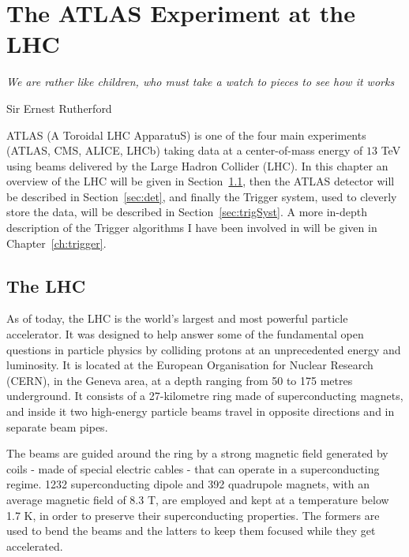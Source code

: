 \chapter{The ATLAS Experiment at the LHC}
\epigraph{\emph{We are rather like children, who must take a watch to pieces to see how it works}}{Sir Ernest Rutherford}

	ATLAS (A Toroidal LHC ApparatuS) is one of the four main experiments (ATLAS, CMS, ALICE, LHCb) taking data at a center-of-mass energy of $13$ TeV using beams delivered by the Large Hadron Collider (LHC). In this chapter an overview of the LHC will be given in Section~\ref{sec:lhc}, then the ATLAS detector will be described in Section~\ref{sec:det}, and finally the Trigger system, used to cleverly store the data, will be described in Section~\ref{sec:trigSyst}. A more in-depth description of the Trigger algorithms I have been involved in will be given in Chapter~\ref{ch:trigger}.



	\section{The LHC}
	\label{sec:lhc}
	
		As of today, the LHC is the world’s largest and most powerful particle accelerator. It was designed to help answer some of the fundamental open questions in particle physics by colliding protons at an unprecedented energy and luminosity. It is located at the European Organisation for Nuclear Research (CERN), in the Geneva area, at a depth ranging from 50 to 175 metres underground. It consists of a 27-kilometre ring made of superconducting magnets, and inside it two high-energy particle beams travel in opposite directions and in separate beam pipes. 

		The beams are guided around the ring by a strong magnetic field generated by coils - made of special electric cables - that can operate in a superconducting regime.%
		1232 superconducting dipole and 392 quadrupole magnets, with an average magnetic field of 8.3 T, are employed and kept at a temperature below 1.7 K, in order to preserve their superconducting properties. The formers are used to bend the beams and the latters to keep them focused while they get accelerated. 
		
